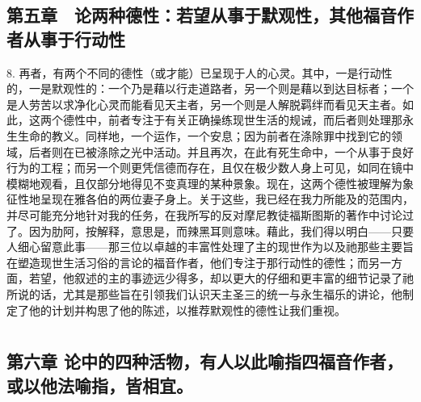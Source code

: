 
\subsection{第五章　论两种德性：若望从事于默观性，其他福音作者从事于行动性}

8. 再者，有两个不同的德性（或才能）已呈现于人的心灵。其中，一是行动性的，一是默观性的：一个乃是藉以行走道路者，另一个则是藉以到达目标者；一个是人劳苦以求净化心灵而能看见天主者，另一个则是人解脱羁绊而看见天主者。如此，这两个德性中，前者专注于有关正确操练现世生活的规诫，而后者则处理那永生生命的教义。同样地，一个运作，一个安息；因为前者在涤除罪中找到它的领域，后者则在已被涤除之光中活动。并且再次，在此有死生命中，一个从事于良好行为的工程；而另一个则更凭信德而存在，且仅在极少数人身上可见，如同在镜中模糊地观看，且仅部分地得见不变真理的某种景象。现在，这两个德性被理解为象征性地呈现在雅各伯的两位妻子身上。关于这些，我已经在我力所能及的范围内，并尽可能充分地针对我的任务，在我所写的反对摩尼教徒福斯图斯的著作中讨论过了。因为肋阿，按解释，意思是，而辣黑耳则意味。藉此，我们得以明白——只要人细心留意此事——那三位以卓越的丰富性处理了主的现世作为以及祂那些主要旨在塑造现世生活习俗的言论的福音作者，他们专注于那行动性的德性；而另一方面，若望，他叙述的主的事迹远少得多，却以更大的仔细和更丰富的细节记录了祂所说的话，尤其是那些旨在引领我们认识天主圣三的统一与永生福乐的讲论，他制定了他的计划并构思了他的陈述，以推荐默观性的德性让我们重视。\par



\section{}


\subsection{第六章 论中的四种活物，有人以此喻指四福音作者，或以他法喻指，皆相宜。}

